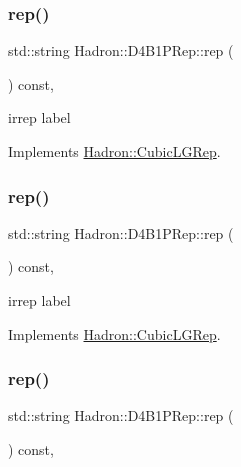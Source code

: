 \subsubsection{\texorpdfstring{rep()}{rep()}\hspace{0.1cm}{\footnotesize\ttfamily [1/3]}}
{\footnotesize\ttfamily std\+::string Hadron\+::\+D4\+B1\+P\+Rep\+::rep (\begin{DoxyParamCaption}{ }\end{DoxyParamCaption}) const\hspace{0.3cm}{\ttfamily [inline]}, {\ttfamily [virtual]}}

irrep label 

Implements \mbox{\hyperlink{structHadron_1_1CubicLGRep_a50f5ddbb8f4be4cee0106fa9e8c75e6c}{Hadron\+::\+Cubic\+L\+G\+Rep}}.

\mbox{\label{structHadron_1_1D4B1PRep_af8dc23f058e45e4ee038bf8e7f2eb5b2}} 
\subsubsection{\texorpdfstring{rep()}{rep()}\hspace{0.1cm}{\footnotesize\ttfamily [2/3]}}
{\footnotesize\ttfamily std\+::string Hadron\+::\+D4\+B1\+P\+Rep\+::rep (\begin{DoxyParamCaption}{ }\end{DoxyParamCaption}) const\hspace{0.3cm}{\ttfamily [inline]}, {\ttfamily [virtual]}}

irrep label 

Implements \mbox{\hyperlink{structHadron_1_1CubicLGRep_a50f5ddbb8f4be4cee0106fa9e8c75e6c}{Hadron\+::\+Cubic\+L\+G\+Rep}}.

\mbox{\label{structHadron_1_1D4B1PRep_af8dc23f058e45e4ee038bf8e7f2eb5b2}} 
\subsubsection{\texorpdfstring{rep()}{rep()}\hspace{0.1cm}{\footnotesize\ttfamily [3/3]}}
{\footnotesize\ttfamily std\+::string Hadron\+::\+D4\+B1\+P\+Rep\+::rep (\begin{DoxyParamCaption}{ }\end{DoxyParamCaption}) const\hspace{0.3cm}{\ttfamily [inline]}, {\ttfamily [virtual]}}

